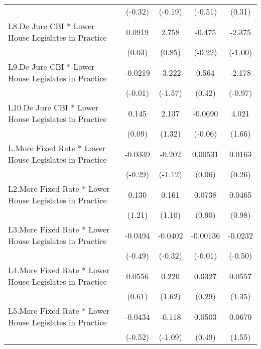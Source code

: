 {\begin{longtable}{l*{4}{c}}
                &  (-0.32)         &  (-0.19)         &  (-0.51)         &   (0.31)         \\
[1em]
L8.De Jure CBI * Lower House Legislates in Practice&   0.0919         &    2.758         &   -0.475         &   -2.375         \\
                &   (0.03)         &   (0.85)         &  (-0.22)         &  (-1.00)         \\
[1em]
L9.De Jure CBI * Lower House Legislates in Practice&  -0.0219         &   -3.222         &    0.564         &   -2.178         \\
                &  (-0.01)         &  (-1.57)         &   (0.42)         &  (-0.97)         \\
[1em]
L10.De Jure CBI * Lower House Legislates in Practice&    0.145         &    2.137         &  -0.0690         &    4.021         \\
                &   (0.09)         &   (1.32)         &  (-0.06)         &   (1.66)         \\
[1em]
L.More Fixed Rate * Lower House Legislates in Practice&  -0.0339         &   -0.202         &  0.00531         &   0.0163         \\
                &  (-0.29)         &  (-1.12)         &   (0.06)         &   (0.26)         \\
[1em]
L2.More Fixed Rate * Lower House Legislates in Practice&    0.130         &    0.161         &   0.0738         &   0.0465         \\
                &   (1.21)         &   (1.10)         &   (0.90)         &   (0.98)         \\
[1em]
L3.More Fixed Rate * Lower House Legislates in Practice&  -0.0494         &  -0.0402         & -0.00136         &  -0.0232         \\
                &  (-0.49)         &  (-0.32)         &  (-0.01)         &  (-0.50)         \\
[1em]
L4.More Fixed Rate * Lower House Legislates in Practice&   0.0556         &    0.220         &   0.0327         &   0.0557         \\
                &   (0.61)         &   (1.62)         &   (0.29)         &   (1.35)         \\
[1em]
L5.More Fixed Rate * Lower House Legislates in Practice&  -0.0434         &   -0.118         &   0.0503         &   0.0670         \\
                &  (-0.52)         &  (-1.09)         &   (0.49)         &   (1.55)         \\

\end{longtable}}
